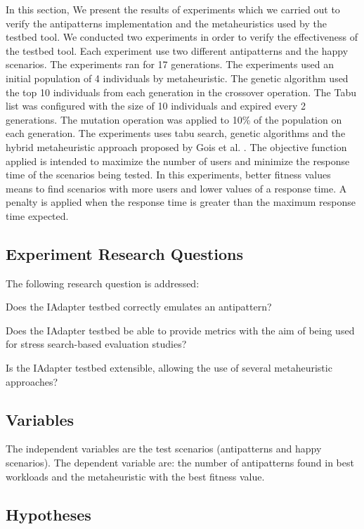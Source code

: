 In this section, We present the results of experiments which we carried out to verify the antipatterns  implementation and the metaheuristics used by the testbed tool. We conducted two experiments in order to verify the effectiveness of the testbed tool. Each experiment use two different antipatterns and the happy scenarios. The experiments ran for 17 generations. The experiments used an initial population of 4 individuals by metaheuristic. The genetic algorithm used the top 10 individuals from each generation in the crossover operation. The Tabu list was configured with the size of 10 individuals and expired every 2 generations.  The mutation operation was applied to 10\% of the population on each generation. The experiments uses tabu search, genetic algorithms and the hybrid metaheuristic approach proposed by Gois et al. \cite{Gois2016}. The objective function applied is intended to maximize the number of users and minimize the response time of the scenarios being tested.  In this experiments, better fitness values means to find scenarios with more users and lower values of a response time. A penalty is applied when the response time is greater than the  maximum response time expected. 

\subsection{Experiment Research Questions}

The following research question is addressed:
\begin{itemize*}
\item Does the IAdapter testbed correctly emulates an antipattern?
\item Does the IAdapter testbed be able to provide metrics with the aim of being used for stress search-based evaluation studies? 
\item Is the IAdapter testbed extensible, allowing the use of several metaheuristic approaches?
\end{itemize*}

\subsection{Variables}

The independent variables are the test scenarios (antipatterns and happy scenarios). The dependent variable are: the number of antipatterns found in best workloads and the metaheuristic with the best fitness value.

\subsection{Hypotheses}


